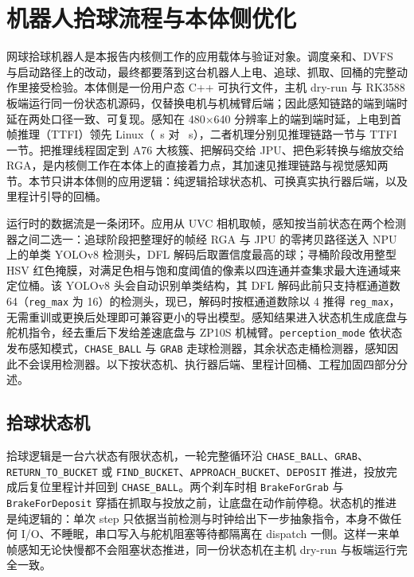 \section{机器人拾球流程与本体侧优化}

网球拾球机器人是本报告内核侧工作的应用载体与验证对象。调度亲和、DVFS 与启动路径上的改动，最终都要落到这台机器人上电、追球、抓取、回桶的完整动作里接受检验。本体侧是一份用户态 C++ 可执行文件，主机 dry-run 与 RK3588 板端运行同一份状态机源码，仅替换电机与机械臂后端；因此感知链路的端到端时延在两处口径一致、可复现。感知在 480$\times$640 分辨率上的端到端时延，上电到首帧推理（TTFI）领先 Linux（\nTtfi~s 对 \nTtfiLin~s），二者机理分别见推理链路一节与 TTFI 一节。把推理线程固定到 A76 大核簇、把解码交给 JPU、把色彩转换与缩放交给 RGA，是内核侧工作在本体上的直接着力点，其加速见推理链路与视觉感知两节。本节只讲本体侧的应用逻辑：纯逻辑拾球状态机、可换真实执行器后端，以及里程计引导的回桶。

运行时的数据流是一条闭环。应用从 UVC 相机取帧，感知按当前状态在两个检测器之间二选一：追球阶段把整理好的帧经 RGA 与 JPU 的零拷贝路径送入 NPU 上的单类 YOLOv8 检测头，DFL 解码后取置信度最高的球；寻桶阶段改用整型 HSV 红色掩膜，对满足色相与饱和度阈值的像素以四连通并查集求最大连通域来定位桶。该 YOLOv8 头会自动识别单类结构，其 DFL 解码此前只支持框通道数 64（\texttt{reg\_max} 为 16）的检测头，现已，解码时按框通道数除以 4 推得 \texttt{reg\_max}，无需重训或更换后处理即可兼容更小的导出模型。感知结果进入状态机生成底盘与舵机指令，经去重后下发给差速底盘与 ZP10S 机械臂。\texttt{perception\_mode} 依状态发布感知模式，\texttt{CHASE\_BALL} 与 \texttt{GRAB} 走球检测器，其余状态走桶检测器，感知因此不会误用检测器。以下按状态机、执行器后端、里程计回桶、工程加固四部分分述。

\subsection{拾球状态机}


拾球逻辑是一台六状态有限状态机，一轮完整循环沿 \texttt{CHASE\_BALL}、\texttt{GRAB}、\texttt{RETURN\_TO\_BUCKET} 或 \texttt{FIND\_BUCKET}、\texttt{APPROACH\_BUCKET}、\texttt{DEPOSIT} 推进，投放完成后复位里程计并回到 \texttt{CHASE\_BALL}。两个刹车时相 \texttt{BrakeForGrab} 与 \texttt{BrakeForDeposit} 穿插在抓取与投放之前，让底盘在动作前停稳。状态机的推进是纯逻辑的：单次 step 只依据当前检测与时钟给出下一步抽象指令，本身不做任何 I/O、不睡眠，串口写入与舵机阻塞等待都隔离在 dispatch 一侧。这样一来单帧感知无论快慢都不会阻塞状态推进，同一份状态机在主机 dry-run 与板端运行完全一致。

